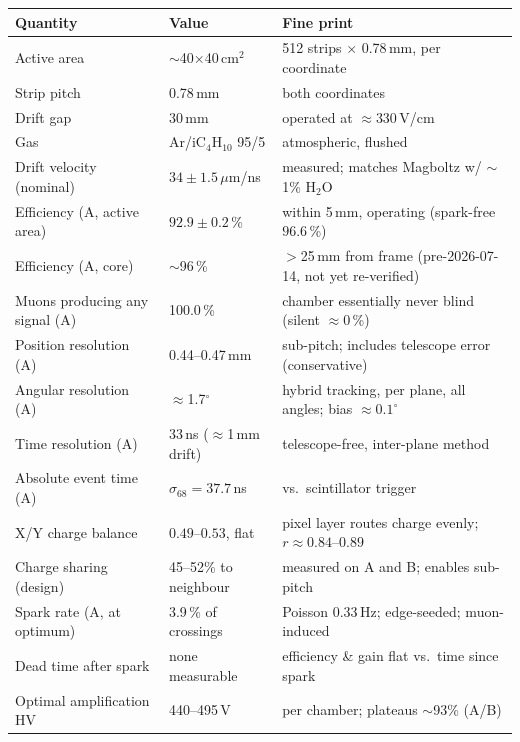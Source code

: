 \documentclass[11pt]{article}
\begin{document}
\begin{center}
\small
\begin{tabular}{@{}p{5.2cm}p{3.6cm}p{6.2cm}@{}}
\toprule
Quantity & Value & Fine print \\
\midrule
Active area & $\sim$40$\times$40\,cm$^2$ & 512 strips $\times$ 0.78\,mm, per coordinate \\
Strip pitch & 0.78\,mm & both coordinates \\
Drift gap & 30\,mm & operated at $\approx$330\,V/cm \\
Gas & Ar/iC$_4$H$_{10}$ 95/5 & atmospheric, flushed \\
Drift velocity (nominal) & $34\pm1.5\,\mu$m/ns & measured; matches Magboltz w/ $\sim$1\% H$_2$O \\
Efficiency (A, active area) & $92.9\pm0.2$\,\% & within 5\,mm, operating (spark-free $96.6$\,\%) \\
Efficiency (A, core) & $\sim$96\,\% & $>$25\,mm from frame (pre-2026-07-14, not yet re-verified) \\
Muons producing any signal (A) & 100.0\,\% & chamber essentially never blind (silent $\approx0$\,\%) \\
Position resolution (A) & 0.44--0.47\,mm & sub-pitch; includes telescope error (conservative) \\
Angular resolution (A) & $\approx$1.7$^\circ$ & hybrid tracking, per plane, all angles; bias $\approx0.1^\circ$ \\
Time resolution (A) & 33\,ns ($\approx$1\,mm drift) & telescope-free, inter-plane method \\
Absolute event time (A) & $\sigma_{68}=37.7$\,ns & vs.\ scintillator trigger \\
X/Y charge balance & $0.49$--$0.53$, flat & pixel layer routes charge evenly; $r\approx0.84$--$0.89$ \\
Charge sharing (design) & 45--52\% to neighbour & measured on A and B; enables sub-pitch \\
Spark rate (A, at optimum) & 3.9\,\% of crossings & Poisson 0.33\,Hz; edge-seeded; muon-induced \\
Dead time after spark & none measurable & efficiency \& gain flat vs.\ time since spark \\
Optimal amplification HV & 440--495\,V & per chamber; plateaus $\sim$93\% (A/B) \\
\bottomrule
\end{tabular}
\end{center}
\end{document}
